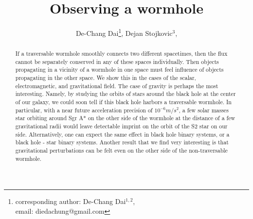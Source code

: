 \documentclass[prd, amsfonts, twocolumn, nofootinbib, showpacs]{revtex4}
\begin{document}
\title{Observing a wormhole }
\author{De-Chang Dai\footnote{corresponding author: De-Chang Dai$^{1,2}$,\\ email: diedachung@gmail.com\label{fnlabel}}, Dejan Stojkovic$^3$,}





\begin{abstract}
\widetext
If a traversable wormhole smoothly connects two different spacetimes, then the flux cannot be separately conserved in any of these spaces individually. Then objects propagating in a vicinity of a wormhole in one space must feel influence of objects propagating in the other space. We show this in the cases of the scalar, electromagnetic, and gravitational field.
The case of gravity is perhaps the most interesting. Namely, by studying the orbits of stars around the black hole at the center of our galaxy, we could soon tell if this black hole harbors a traversable wormhole. In particular, with a near future acceleration precision of $10^{-6} m/s^2$, a few
solar masses star orbiting around Sgr A* on the other side of the wormhole at the distance of a few gravitational radii would leave detectable imprint
on the orbit of the S2 star on our side. Alternatively, one can expect the same effect in black hole binary systems, or a black hole - star binary systems.
Another result that we find very interesting is that gravitational perturbations can be felt even on the other side of the non-traversable wormhole.

\end{abstract}

\pacs{}
\maketitle
\end{document}
